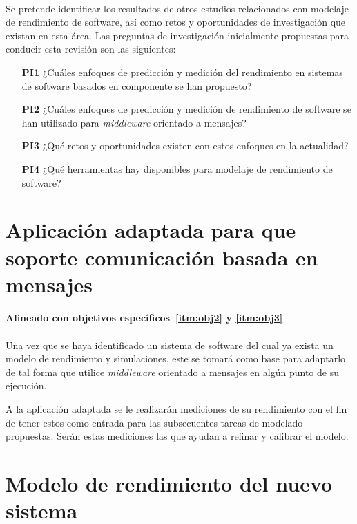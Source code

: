 \documentclass[11pt, twoside]{report}
\begin{document}
\paragraph{} Se pretende identificar los resultados de otros estudios relacionados con modelaje de rendimiento de software, así como retos y oportunidades de investigación que existan en esta área. Las preguntas de investigación inicialmente propuestas para conducir esta revisión son las siguientes:
\begin{enumerate}
    \item[\textbf{PI1}] ¿Cuáles enfoques de predicción y medición del rendimiento en sistemas de software basados en componente se han propuesto?
    \item[\textbf{PI2}] ¿Cuáles enfoques de predicción y medición de rendimiento de software se han utilizado para \emph{middleware} orientado a mensajes?    
    \item[\textbf{PI3}] ¿Qué retos y oportunidades existen con estos enfoques en la actualidad?
    \item[\textbf{PI4}] ¿Qué herramientas hay disponibles para modelaje de rendimiento de software?
\end{enumerate}


\section{Aplicación adaptada para que soporte comunicación basada en mensajes}
\paragraph{Alineado con objetivos específicos~\ref{itm:obj2} y \ref{itm:obj3}}  

\paragraph{}Una vez que se haya identificado un sistema de software del cual ya exista un modelo de rendimiento y simulaciones, este se tomará como base para adaptarlo de tal forma que utilice \emph{middleware} orientado a mensajes en algún punto de su ejecución.

A la aplicación adaptada se le realizarán mediciones de su rendimiento con el fin de tener estos como entrada para las subsecuentes tareas de modelado propuestas. Serán estas mediciones las que ayudan a refinar y calibrar el modelo.

\section{Modelo de rendimiento del nuevo sistema}
\end{document}
